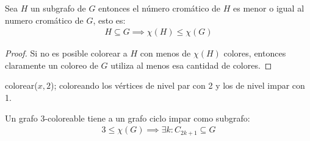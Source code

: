 \begin{lemma}\label{chi_subgrafo}
Sea $H$ un subgrafo de $G$ entonces el número cromático de $H$ es menor o igual al numero cromático de $G$, esto es:
    \begin{align}
        H \subseteq G \implies \chi(H) \le \chi(G)
    \end{align}
\end{lemma}
\begin{proof}
Si no es posible colorear a $H$ con menos de $\chi(H)$ colores, entonces claramente un coloreo de $G$ utiliza al menos esa cantidad de colores.
\end{proof}

\begin{algorithm}
\begin{algorithmic}
    \State colorear($x, 2$);
    \State {} coloreando los vértices de nivel par con 2 y los de nivel impar con 1.
    \EndFor
    \EndFunction
\end{algorithmic}
\end{algorithm}

\begin{lemma}\label{3colores_cicloimpar}
Un grafo $3$-coloreable tiene a un grafo ciclo impar como subgrafo:
\begin{align}
    3 \le \chi(G) \implies \exists k \colon C_{2k+1} \subseteq G 
\end{align}
\end{lemma}

